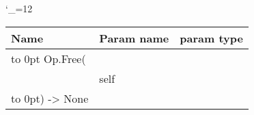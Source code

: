 \begingroup \catcode`\_=12 \tt
\begin{tabular}{lll}
\toprule
\textrm{Name}&\textrm{Param name}&\textrm{param type}\\
\midrule
\hbox to 0pt {Op.Free(\hss}\\
& self\\
\hbox to 0pt{) -> None\hss}\\
\bottomrule
\end{tabular}
\endgroup
